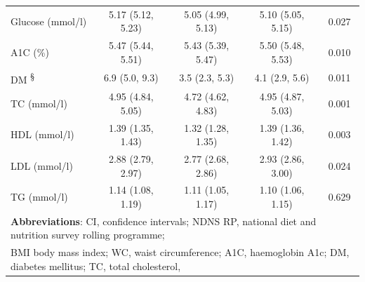 \begin{table}[H]
\begin{tabular}[t]{lcccc}
		Glucose (mmol/l) & 5.17 (5.12, 5.23) & 5.05 (4.99, 5.13) & 5.10 (5.05, 5.15) & 0.027\\
		A1C (\%) & 5.47 (5.44, 5.51) & 5.43 (5.39, 5.47) & 5.50 (5.48, 5.53) & 0.010\\
		DM \textsuperscript{\S} & 6.9 (5.0, 9.3) & 3.5 (2.3, 5.3) & 4.1 (2.9, 5.6) & 0.011\\
		TC (mmol/l) & 4.95 (4.84, 5.05) & 4.72 (4.62, 4.83) & 4.95 (4.87, 5.03) & 0.001 \\
		HDL (mmol/l) & 1.39 (1.35, 1.43)& 1.32 (1.28, 1.35) & 1.39 (1.36, 1.42)& 0.003 \\ 
		LDL (mmol/l) &  2.88 (2.79, 2.97) & 2.77 (2.68, 2.86) & 2.93 (2.86, 3.00)& 0.024 \\ 
		TG (mmol/l) &  1.14 (1.08, 1.19) &  1.11 (1.05, 1.17) & 1.10 (1.06, 1.15) & 0.629\\
		\bottomrule
		\multicolumn{5}{l}{{\scriptsize \textbf{Abbreviations}: CI, confidence intervals; NDNS RP, national diet and nutrition survey rolling programme;}}\\
		\multicolumn{5}{l}{{\scriptsize BMI body mass index; WC, waist circumference; A1C, haemoglobin A1c; DM, diabetes mellitus; TC, total cholesterol, }}\\

\end{tabular}
\end{table}
